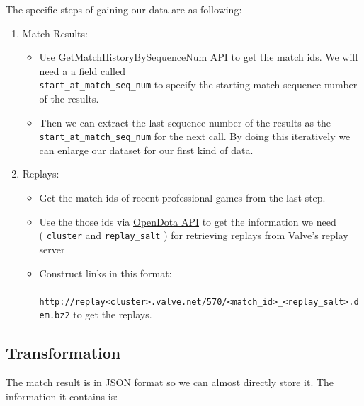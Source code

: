\documentclass{article}
\newcommand{\codeinline}[1]{
	\texttt{#1}
}
\begin{document}
The specific steps of gaining our data are as following:

\begin{enumerate}
\item Match Results:
	\begin{itemize}
		\item Use \href{https://wiki.teamfortress.com/wiki/WebAPI/GetMatchHistoryBySequenceNum}{GetMatchHistoryBySequenceNum} API to get the match ids. We will need a a field called \\ \codeinline{start_at_match_seq_num} to specify the starting match sequence number of the results.
		\item Then we can extract the last sequence number of the results as the \codeinline{start_at_match_seq_num} for the next call. By doing this iteratively we can enlarge our dataset for our first kind of data.
	\end{itemize}
\item Replays:
	\begin{itemize}
		\item Get the match ids of recent professional games from the last step.
		\item Use the those ids via \href{https://docs.opendota.com/#tag/matches}{OpenDota API} to get the information we need \\ (\codeinline{cluster} and \codeinline{replay_salt}) for retrieving replays from Valve's replay server
		\item Construct links in this format:\\  \codeinline{ http://replay<cluster>.valve.net/570/<match_id>_<replay_salt>.dem.bz2} to get the replays.
	\end{itemize}
\end{enumerate}


\subsection{Transformation}

The match result is in JSON format so we can almost directly store it. The information it contains is:
\end{document}
